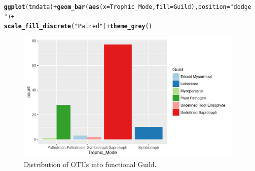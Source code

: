 \documentclass[12pt]{article}\usepackage[]{graphicx}\usepackage[]{color}
\makeatletter
\def\maxwidth{ %
  \ifdim\Gin@nat@width>\linewidth
    \linewidth
  \else
    \Gin@nat@width
  \fi
}
\newcommand{\hlstr}[1]{\textcolor[rgb]{0.192,0.494,0.8}{#1}}%
\newcommand{\hlopt}[1]{\textcolor[rgb]{0,0,0}{#1}}%
\newcommand{\hlstd}[1]{\textcolor[rgb]{0.345,0.345,0.345}{#1}}%
\newcommand{\hlkwc}[1]{\textcolor[rgb]{0.333,0.667,0.333}{#1}}%
\newcommand{\hlkwd}[1]{\textcolor[rgb]{0.737,0.353,0.396}{\textbf{#1}}}%
\newenvironment{kframe}{%
 \def\at@end@of@kframe{}%
 \ifinner\ifhmode%
  \def\at@end@of@kframe{\end{minipage}}%
  \begin{minipage}{\columnwidth}%
 \fi\fi%
 \def\FrameCommand##1{\hskip\@totalleftmargin \hskip-\fboxsep
 \colorbox{shadecolor}{##1}\hskip-\fboxsep
     \hskip-\linewidth \hskip-\@totalleftmargin \hskip\columnwidth}%
 \MakeFramed {\advance\hsize-\width
   \@totalleftmargin\z@ \linewidth\hsize
   \@setminipage}}%
 {\par\unskip\endMakeFramed%
 \at@end@of@kframe}
\newenvironment{knitrout}{}{} %
\numberwithin{figure}{section}
\makeatother
\begin{document}
\begin{knitrout}\small
{}\color{fgcolor}\begin{kframe}
\begin{alltt}
\hlkwd{ggplot}\hlstd{(tmdata)} \hlopt{+} \hlkwd{geom_bar}\hlstd{(}\hlkwd{aes}\hlstd{(}\hlkwc{x}\hlstd{= Trophic_Mode,} \hlkwc{fill}\hlstd{=Guild),} \hlkwc{position} \hlstd{=} \hlstr{"dodge"}\hlstd{)} \hlopt{+}
  \hlkwd{scale_fill_discrete}\hlstd{(}\hlstr{"Paired"}\hlstd{)}\hlopt{+} \hlkwd{theme_grey}\hlstd{()}
\end{alltt}
\end{kframe}\begin{figure}

{\centering \includegraphics[width=\maxwidth]{figure/unnamed-chunk-33-1} 

}

\caption[Distribution of OTUs into functional Guild]{Distribution of OTUs into functional Guild.}\label{fig:unnamed-chunk-33}
\end{figure}


\end{knitrout}
\end{document}
